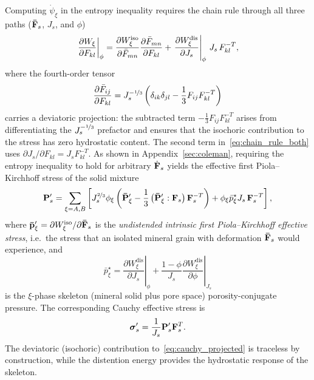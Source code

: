 \documentclass[11pt]{article}
\begin{document}
Computing $\dot\psi_\xi$ in the entropy inequality requires the chain rule through all three paths ($\mathbf{\bar F}_s$, $J_s$, and $\phi$)
%
\begin{equation}
  \left.\frac{\partial W_\xi}{\partial F_{kl}}\right\vert_\phi = \frac{\partial W^{\text{iso}}_\xi}{\partial \bar{F}_{mn}} \frac{\partial \bar{F}_{mn}}{\partial F_{kl}} + \left.\frac{\partial W_\xi^{\text{dis}}}{\partial J_s}\right\vert_\phi\, J_s\, F^{-T}_{kl},
  \label{eq:chain_rule_both}
\end{equation}
%
where the fourth-order tensor
%
\begin{align}
  \frac{\partial \bar{F}_{ij}}{\partial F_{kl}} = J_s^{-\nicefrac{1}{3}}\left(\delta_{ik}\delta_{jl} - \frac{1}{3} F_{ij} F^{-T}_{kl}\right)
  \label{eq:chain_rule_Fbar}
\end{align}
%
carries a deviatoric projection: the subtracted term $-\frac{1}{3}F_{ij}F^{-T}_{kl}$ arises from differentiating the $J_s^{-\nicefrac{1}{3}}$ prefactor and ensures that the isochoric contribution to the stress has zero hydrostatic content.  The second term in~\eqref{eq:chain_rule_both} uses $\partial J_s / \partial F_{kl} = J_s F^{-T}_{kl}$.  As shown in Appendix~\ref{sec:coleman}, requiring the entropy inequality to hold for arbitrary $\dot{\mathbf{F}}_s$ yields the effective first Piola--Kirchhoff stress of the solid mixture
%
\begin{align}
  \mathbf{P}'_s = \sum_{\xi=A,B}\left[{J_s^{\nicefrac{2}{3}}  \phi_\xi \left(\mathbf{\bar P}'_\xi - \frac{1}{3}\left(\mathbf{\bar P}'_\xi : \mathbf{F}_s\right) \mathbf{F}_s^{-T}\right)} + \phi_\xi{\bar{p}_\xi^\star J_s\,  \mathbf{F} _s^{-T}}\right],
  \label{eq:P_projected}
\end{align}
%
where $\mathbf{\bar p}'_\xi = \partial W^{\text{iso}}_\xi / \partial\mathbf{\bar F}_s$ is the \emph{undistended intrinsic first Piola--Kirchhoff effective stress}, i.e.\ the stress that an isolated mineral grain with deformation $\mathbf{\bar F}_s$ would experience, and
%
\begin{equation}
  \bar{p}^\star_\xi = \left.\frac{\partial W_\xi^{\text{dis}}}{\partial J_s}\right\vert_\phi + \frac{1-\phi}{J_s}\left.\frac{\partial W_\xi^{\text{dis}}}{\partial \phi}\right\vert_{J_s}
  \label{eq:Kstar_def}
\end{equation}
%
is the $\xi$-phase skeleton (mineral solid plus pore space) porosity-conjugate pressure.  The corresponding Cauchy effective stress is
%
\begin{align}
  \boldsymbol{\sigma}'_s = \frac{1}{J_s}\mathbf{P}'_s \mathbf{F}_s^T.
  \label{eq:cauchy_projected}
\end{align}
%
The deviatoric (isochoric) contribution to~\eqref{eq:cauchy_projected} is traceless by construction, while the distention energy provides the hydrostatic response of the skeleton.
\end{document}
